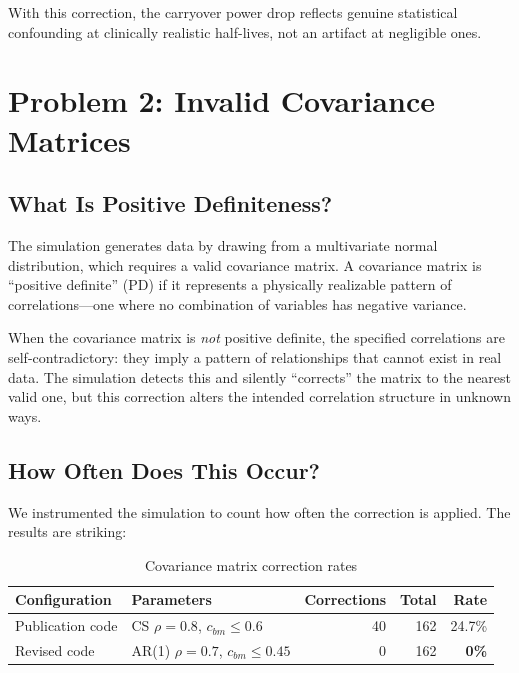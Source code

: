 \documentclass[11pt]{article}
\begin{document}
With this correction, the carryover power drop reflects
genuine statistical confounding at clinically realistic
half-lives, not an artifact at negligible ones.

\section{Problem 2: Invalid Covariance Matrices}

\subsection{What Is Positive Definiteness?}

The simulation generates data by drawing from a multivariate
normal distribution, which requires a valid covariance matrix.
A covariance matrix is ``positive definite'' (PD) if it
represents a physically realizable pattern of correlations---one
where no combination of variables has negative variance.

When the covariance matrix is \emph{not} positive definite, the
specified correlations are self-contradictory: they imply a
pattern of relationships that cannot exist in real data. The
simulation detects this and silently ``corrects'' the matrix to
the nearest valid one, but this correction alters the intended
correlation structure in unknown ways.

\subsection{How Often Does This Occur?}

We instrumented the simulation to count how often the
correction is applied. The results are striking:

\begin{table}[h]
\centering
\caption{Covariance matrix correction rates}
\begin{tabular}{llrrr}
\toprule
Configuration & Parameters & Corrections & Total & Rate \\
\midrule
Publication code & CS $\rho=0.8$, $c_{bm} \leq 0.6$ &
  40 & 162 & 24.7\% \\
Revised code & AR(1) $\rho=0.7$, $c_{bm} \leq 0.45$ &
  0 & 162 & \textbf{0\%} \\
\bottomrule
\end{tabular}
\end{table}
\end{document}
